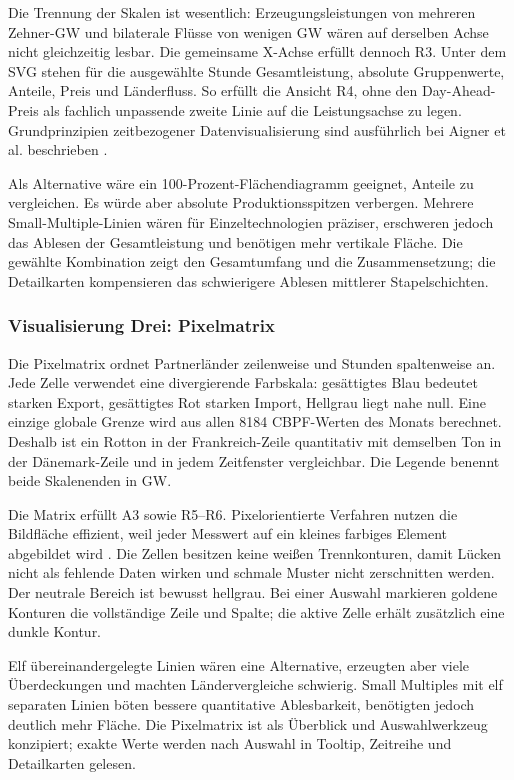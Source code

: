 Die Trennung der Skalen ist wesentlich: Erzeugungsleistungen von mehreren
Zehner-GW und bilaterale Flüsse von wenigen GW wären auf derselben Achse nicht
gleichzeitig lesbar. Die gemeinsame X-Achse erfüllt dennoch R3. Unter dem SVG
stehen für die ausgewählte Stunde Gesamtleistung, absolute Gruppenwerte,
Anteile, Preis und Länderfluss. So erfüllt die Ansicht R4, ohne den
Day-Ahead-Preis als fachlich unpassende zweite Linie auf die Leistungsachse zu
legen. Grundprinzipien zeitbezogener Datenvisualisierung sind ausführlich bei
Aigner et al. beschrieben \cite{aigner2011time}.

Als Alternative wäre ein 100-Prozent-Flächendiagramm geeignet, Anteile zu
vergleichen. Es würde aber absolute Produktionsspitzen verbergen. Mehrere
Small-Multiple-Linien wären für Einzeltechnologien präziser, erschweren jedoch
das Ablesen der Gesamtleistung und benötigen mehr vertikale Fläche. Die
gewählte Kombination zeigt den Gesamtumfang und die Zusammensetzung; die
Detailkarten kompensieren das schwierigere Ablesen mittlerer Stapelschichten.

\subsubsection{Visualisierung Drei: Pixelmatrix}
\label{sec:vis3}

Die Pixelmatrix ordnet Partnerländer zeilenweise und Stunden spaltenweise an.
Jede Zelle verwendet eine divergierende Farbskala: gesättigtes Blau bedeutet
starken Export, gesättigtes Rot starken Import, Hellgrau liegt nahe null. Eine
einzige globale Grenze wird aus allen 8184 CBPF-Werten des Monats berechnet.
Deshalb ist ein Rotton in der Frankreich-Zeile quantitativ mit demselben Ton in
der Dänemark-Zeile und in jedem Zeitfenster vergleichbar. Die Legende benennt
beide Skalenenden in GW.

Die Matrix erfüllt A3 sowie R5--R6. Pixelorientierte Verfahren nutzen die
Bildfläche effizient, weil jeder Messwert auf ein kleines farbiges Element
abgebildet wird \cite{keim2000pixel}. Die Zellen besitzen keine wei{\ss}en
Trennkonturen, damit Lücken nicht als fehlende Daten wirken und schmale Muster
nicht zerschnitten werden. Der neutrale Bereich ist bewusst hellgrau. Bei einer
Auswahl markieren goldene Konturen die vollständige Zeile und Spalte; die aktive
Zelle erhält zusätzlich eine dunkle Kontur.

Elf übereinandergelegte Linien wären eine Alternative, erzeugten aber viele
Überdeckungen und machten Ländervergleiche schwierig. Small Multiples mit elf
separaten Linien böten bessere quantitative Ablesbarkeit, benötigten jedoch
deutlich mehr Fläche. Die Pixelmatrix ist als Überblick und Auswahlwerkzeug
konzipiert; exakte Werte werden nach Auswahl in Tooltip, Zeitreihe und
Detailkarten gelesen.

